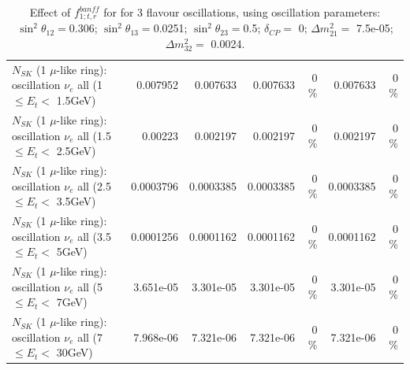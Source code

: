 \begin{table}
\begin{tabular}{| l | r | r | r  r | r  r |}
$N_{SK}$ (1 $\mu$-like ring): oscillation $\nu_{e}$ all (1 $\leq E_{t} <$ 1.5GeV) &        0.007952 &        0.007633 &        0.007633 &        0 \%  &        0.007633 &        0 \%  \\ 
$N_{SK}$ (1 $\mu$-like ring): oscillation $\nu_{e}$ all (1.5 $\leq E_{t} <$ 2.5GeV) &         0.00223 &        0.002197 &        0.002197 &        0 \%  &        0.002197 &        0 \%  \\ 
$N_{SK}$ (1 $\mu$-like ring): oscillation $\nu_{e}$ all (2.5 $\leq E_{t} <$ 3.5GeV) &       0.0003796 &       0.0003385 &       0.0003385 &        0 \%  &       0.0003385 &        0 \%  \\ 
$N_{SK}$ (1 $\mu$-like ring): oscillation $\nu_{e}$ all (3.5 $\leq E_{t} <$ 5GeV) &       0.0001256 &       0.0001162 &       0.0001162 &        0 \%  &       0.0001162 &        0 \%  \\ 
 $N_{SK}$ (1 $\mu$-like ring): oscillation $\nu_{e}$ all (5 $\leq E_{t} <$ 7GeV) &       3.651e-05 &       3.301e-05 &       3.301e-05 &        0 \%  &       3.301e-05 &        0 \%  \\ 
$N_{SK}$ (1 $\mu$-like ring): oscillation $\nu_{e}$ all (7 $\leq E_{t} <$ 30GeV) &       7.968e-06 &       7.321e-06 &       7.321e-06 &        0 \%  &       7.321e-06 &        0 \%  \\ 
\hline
\hline
\end{tabular}
\caption{ Effect of $f_{1; t, r}^{banff}$ for for 3 flavour oscillations, using oscillation parameters:  $\sin^2\theta_{12} = $0.306; $\sin^2\theta_{13} = $0.0251; $\sin^2\theta_{23} = $0.5; $\delta_{CP} = $        0; $\Delta m^2_{21} = $    7.5e-05; $\Delta m^2_{32} = $    0.0024. }
\label{tab:num_banff_01_1RmuT_3f_osc_t13:0.0251}
\end{table}
\clearpage
